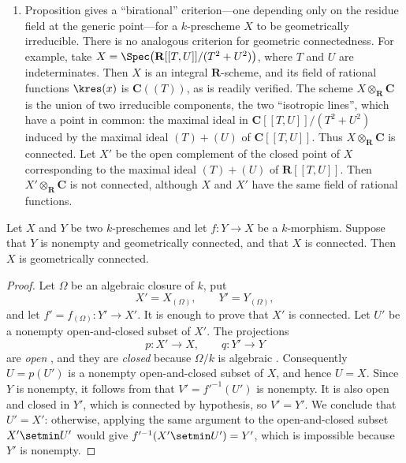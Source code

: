 \begin{remarks}[4.5.12]
\begin{enumerate}
\item[\rm(ii)]
\label{IV.4.5.12.ii}
Proposition  gives a ``birational'' criterion---one
depending only on the residue field at the generic point---for a
$k$-prescheme $X$ to be geometrically irreducible.
There is no analogous criterion for geometric connectedness.
For example, take $X=\Spec\bigl(\mathbf{R}[[T,U]]/(T^2+U^2)\bigr)$,
where $T$ and $U$ are indeterminates.
Then $X$ is an integral $\mathbf{R}$-scheme, and its field of rational
functions $\kres(x)$ is $\mathbf{C}((T))$, as is readily verified.
The scheme $X\otimes_{\mathbf R}\mathbf C$ is the union of two
irreducible components, the two ``isotropic lines'', which have a
point in common: the maximal ideal in
$\mathbf C[[T,U]]/(T^2+U^2)$ induced by the maximal ideal
$(T)+(U)$ of $\mathbf C[[T,U]]$.
Thus $X\otimes_{\mathbf R}\mathbf C$ is connected.
Let $X'$ be the open complement of the closed point of $X$
corresponding to the maximal ideal $(T)+(U)$ of
$\mathbf R[[T,U]]$.
Then $X'\otimes_{\mathbf R}\mathbf C$ is not connected, although $X$
and $X'$ have the same field of rational functions.
\end{enumerate}
\end{remarks}

\begin{proposition}[4.5.13]
\label{IV.4.5.13}
Let $X$ and $Y$ be two $k$-preschemes and let
$f:Y\to X$ be a $k$-morphism.
Suppose that $Y$ is nonempty and geometrically connected, and that
$X$ is connected.
Then $X$ is geometrically connected.
\end{proposition}

\begin{proof}
Let $\Omega$ be an algebraic closure of $k$, put
\[
X'=X_{(\Omega)},\qquad
Y'=Y_{(\Omega)},
\]
and let $f'=f_{(\Omega)}:Y'\to X'$.
It is enough to prove that $X'$ is connected.
Let $U'$ be a nonempty open-and-closed subset of $X'$.
The projections
\[
p:X'\longrightarrow X,\qquad q:Y'\longrightarrow Y
\]
are \emph{open} , and they are \emph{closed} because $\Omega/k$ is
algebraic .
Consequently $U=p(U')$ is a nonempty open-and-closed subset of $X$,
and hence $U=X$.
Since $Y$ is nonempty, it follows from  that $V'=f'^{-1}(U')$
is nonempty.
It is also open and closed in $Y'$, which is connected by hypothesis,
so $V'=Y'$.
We conclude that $U'=X'$: otherwise, applying the same argument to
the open-and-closed subset $X'\setmin U'$ would give
$f'^{-1}(X'\setmin U')=Y'$, which is impossible because $Y'$ is
nonempty.
\end{proof}

